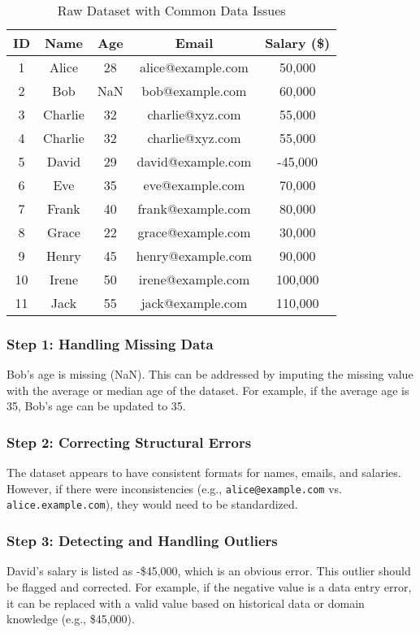 \documentclass[12pt]{article}
\begin{document}
\begin{table}[h!]
    \centering
    \begin{tabular}{|c|c|c|c|c|}
        \hline
        \textbf{ID} & \textbf{Name} & \textbf{Age} & \textbf{Email} & \textbf{Salary (\$)} \\
        \hline
        1 & Alice & 28 & alice@example.com & 50,000 \\
        2 & Bob & NaN & bob@example.com & 60,000 \\
        3 & Charlie & 32 & charlie@xyz.com & 55,000 \\
        4 & Charlie & 32 & charlie@xyz.com & 55,000 \\
        5 & David & 29 & david@example.com & -45,000 \\
        6 & Eve & 35 & eve@example.com & 70,000 \\
        7 & Frank & 40 & frank@example.com & 80,000 \\
        8 & Grace & 22 & grace@example.com & 30,000 \\
        9 & Henry & 45 & henry@example.com & 90,000 \\
        10 & Irene & 50 & irene@example.com & 100,000 \\
        11 & Jack & 55 & jack@example.com & 110,000 \\
        \hline
    \end{tabular}
    \caption{Raw Dataset with Common Data Issues}
    \label{tab:raw_data}
\end{table}

\subsubsection{Step 1: Handling Missing Data}
Bob’s age is missing (NaN). This can be addressed by imputing the missing value with the average or median age of the dataset. For example, if the average age is 35, Bob’s age can be updated to 35.

\subsubsection{Step 2: Correcting Structural Errors}
The dataset appears to have consistent formats for names, emails, and salaries. However, if there were inconsistencies (e.g., \texttt{alice@example.com} vs. \texttt{alice.example.com}), they would need to be standardized.

\subsubsection{Step 3: Detecting and Handling Outliers}
David’s salary is listed as -\$45,000, which is an obvious error. This outlier should be flagged and corrected. For example, if the negative value is a data entry error, it can be replaced with a valid value based on historical data or domain knowledge (e.g., \$45,000).
\end{document}
